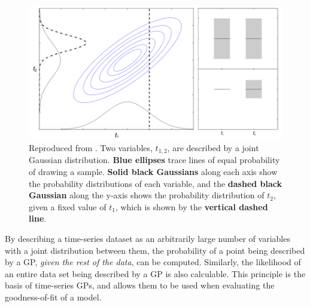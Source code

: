 \begin{figure}
    \centering
    \includegraphics[width=.8\textwidth, clip, trim={0 0 8.5cm 0}]{figures/modelling/joint_distribution.png}
    \caption{Reproduced from \citet{McallisterThesis}. Two variables, $t_{1,2}$, are described by a joint Gaussian distribution. {\bf Blue ellipses} trace lines of equal probability of drawing a sample. {\bf Solid black Gaussians} along each axis show the probability distributions of each variable, and the {\bf dashed black Gaussian} along the y-axis shows the probability distribution of $t_2$, given a fixed value of $t_1$, which is shown by the {\bf vertical dashed line}.}
    \label{fig:modelling:joint distribution}
\end{figure}

By describing a time-series dataset as an arbitrarily large number of variables with a joint distribution between them, the probability of a point being described by a GP, \textit{given the rest of the data}, can be computed. Similarly, the likelihood of an entire data set being described by a GP is also calculable. This principle is the basis of time-series GPs, and allows them to be used when evaluating the goodness-of-fit of a model.

